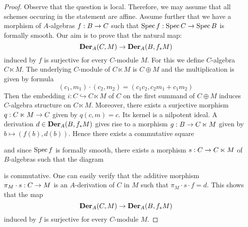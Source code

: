 \begin{proof}
Observe that the question is local. Therefore, we may assume that all schemes occuring in the statement are affine. Assume further that we have a morphism of $A$-algebras $f:B\rightarrow C$ such that $\mathrm{Spec}\, f:\mathrm{Spec}\, C\rightarrow \mathrm{Spec}\, B$ is formally smooth. Our aim is to prove that the natural map:
$$\mathbf{Der}_A(C,M)\rightarrow \mathbf{Der}_A(B,f_*M)$$
induced by $f$ is surjective for every $C$-module $M$. For this we define $C$-algebra $C\ltimes M$. The underlying $C$-module of $C\ltimes M$ is $C\oplus M$ and the multiplication is given by formula
$$(c_1,m_1)\cdot (c_2,m_2)=(c_1c_2,c_2m_1+c_1m_2)$$
Then the embedding $i:C\hookrightarrow  C\ltimes M$ of $C$ on the first summand of $C\oplus M$ induces $C$-algebra structure on $C\ltimes M$. Moreover, there exists a surjective morphism $q:C\ltimes M\rightarrow C$ given by $q(c,m)=c$. Its kernel is a nilpotent ideal. A derivation $d \in \mathbf{Der}_A(B,f_*M)$ gives rise to a morphism $g:B\rightarrow C\ltimes M$ given by $b\mapsto (f(b),d(b))$. Hence there exists a commutative square
\begin{center}
\end{center}
and since $\mathrm{Spec}\, f$ is formally smooth, there exists a morphism $s:C\rightarrow C\ltimes M$ of $B$-algebras such that the diagram 
\begin{center}
\end{center}
is commutative. One can easily verify that the additive morphism $\pi_M\cdot s:C\rightarrow M$ is an $A$-derivation of $C$ in $M$ such that $\pi_M\cdot s\cdot f = d$. This shows that the map
$$\mathbf{Der}_A(C,M)\rightarrow \mathbf{Der}_A(B,f_*M)$$
induced by $f$ is surjective for every $C$-module $M$.
\end{proof}

